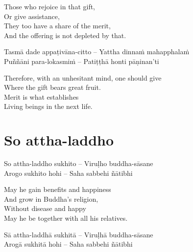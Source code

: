 \begin{english-verses}
  Those who rejoice in that gift,\\
  Or give assistance,\\
  They too have a share of the merit,\\
  And the offering is not depleted by that.
\end{english-verses}

\begin{twochants}
  Tasmā dade appaṭivāna-citto – Yattha dinnaṁ mahapphalaṁ\\
  Puññāni para-lokasmiṁ – Patiṭṭhā honti pāṇinan'ti
\end{twochants}

\begin{english-verses}
  Therefore, with an unhesitant mind, one should give\\
  Where the gift bears great fruit.\\
  Merit is what establishes\\
  Living beings in the next life.
\end{english-verses}

\suttaRef{[AN 5.36]}

\section{So attha-laddho}
\label{so-attha-laddho}

 \vspace{-0.6em}

\begin{twochants}
  So attha-laddho sukhito – Viruḷho buddha-sāsane\\
  Arogo sukhito hohi – Saha sabbehi ñātibhi
\end{twochants}

\begin{english-verses}
  May he gain benefits and happiness\\
  And grow in Buddha's religion,\\
  Without disease and happy\\
  May he be together with all his relatives.
\end{english-verses}

\begin{twochants}
  Sā attha-laddhā sukhitā – Viruḷhā buddha-sāsane\\
  Arogā sukhitā hohi – Saha sabbehi ñātibhi
\end{twochants}

